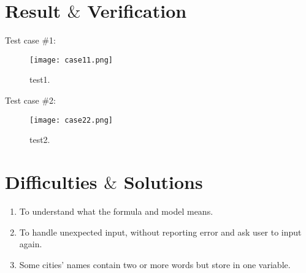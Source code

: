 \documentclass[11pt]{scrartcl} %
\begin{document}



\newpage
\section{ Result $\&$ Verification}

\vspace{20pt}

{Test case $\#$1:}

\vspace{20pt}
\begin{figure}[htb] %
	\centering
	\texttt{[image: case11.png]} %
	\caption{test1.}
\end{figure}
\vspace{20pt}
{Test case $\#$2:}

\vspace{20pt}
\begin{figure}[htb] %
	\centering
	\texttt{[image: case22.png]} %
	\caption{test2.}
\end{figure}






\section{Difficulties $\&$ Solutions}
\begin{enumerate}
  \item To understand what the formula and model means.
  \item To handle unexpected input, without reporting error and ask user to input again.
  \item Some cities’ names contain two or more words but store in one variable.
\end{enumerate}

\end{document}
